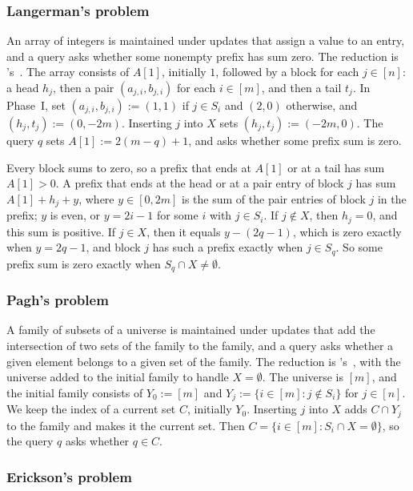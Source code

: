 \subsubsection{Langerman's problem}\label{sec:langerman}

An array of integers is maintained under updates that assign a value to an entry, and a query asks whether some nonempty prefix has sum zero. The reduction is \Patrascu's~\cite[Appendix~A]{patrascu_mihai_towards_2010}. The array consists of $A[1]$, initially $1$, followed by a block for each $j\in[n]$: a head $h_j$, then a pair $(a_{j,i},b_{j,i})$ for each $i\in[m]$, and then a tail $t_j$. In Phase~I, set $(a_{j,i},b_{j,i}):=(1,1)$ if $j\in S_i$ and $(2,0)$ otherwise, and $(h_j,t_j):=(0,-2m)$. Inserting $j$ into $X$ sets $(h_j,t_j):=(-2m,0)$. The query $q$ sets $A[1]:=2(m-q)+1$, and asks whether some prefix sum is zero.

Every block sums to zero, so a prefix that ends at $A[1]$ or at a tail has sum $A[1]>0$. A prefix that ends at the head or at a pair entry of block $j$ has sum $A[1]+h_j+y$, where $y\in[0,2m]$ is the sum of the pair entries of block $j$ in the prefix; $y$ is even, or $y=2i-1$ for some $i$ with $j\in S_i$. If $j\notin X$, then $h_j=0$, and this sum is positive. If $j\in X$, then it equals $y-(2q-1)$, which is zero exactly when $y=2q-1$, and block $j$ has such a prefix exactly when $j\in S_q$. So some prefix sum is zero exactly when $S_q\cap X\ne\emptyset$.

\subsubsection{Pagh's problem}\label{sec:pagh}

A family of subsets of a universe is maintained under updates that add the intersection of two sets of the family to the family, and a query asks whether a given element belongs to a given set of the family. The reduction is \Patrascu's~\cite[Appendix~A]{patrascu_mihai_towards_2010}, with the universe added to the initial family to handle $X=\emptyset$. The universe is $[m]$, and the initial family consists of $Y_0:=[m]$ and $Y_j:=\{i\in[m]:j\notin S_i\}$ for $j\in[n]$. We keep the index of a current set $C$, initially $Y_0$. Inserting $j$ into $X$ adds $C\cap Y_j$ to the family and makes it the current set. Then $C=\{i\in[m]:S_i\cap X=\emptyset\}$, so the query $q$ asks whether $q\in C$.

\subsubsection{Erickson's problem}\label{sec:erickson}

